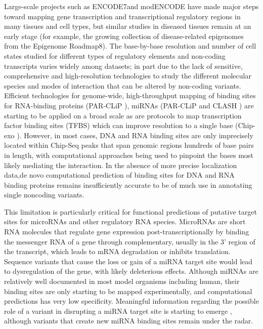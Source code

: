 Large-scale projects such as ENCODE7and modENCODE \cite{celniker2009unlocking} have made major steps toward mapping gene transcription and transcriptional regulatory regions in many tissues and cell types, but similar studies in diseased tissues remain at an early stage (for example, the growing collection of disease-related epigenomes from the Epigenome Roadmap8). The base-by-base resolution and number of cell states studied for different types of regulatory elements and non-coding transcripts varies widely among datasets; in part due to the lack of sensitive, comprehensive and high-resolution technologies to study the different molecular species and modes of interaction that can be altered by non-coding variants. Efficient technologies for genome-wide, high-throughput mapping of binding sites for RNA-binding proteins (PAR-CLiP \cite{ascano2012identification}), miRNAs (PAR-CLiP \cite{hafner2012genome} and CLASH \cite{helwak2013mapping}) are starting to be applied on a broad scale as are protocols to map transcription factor binding sites (TFBS) which can improve resolution to a single base (Chip-exo \cite{rhee2012chip}). However, in most cases, DNA and RNA binding sites are only imprecisely located within Chip-Seq peaks that span genomic regions hundreds of base pairs in length, with computational approaches being used to pinpoint the bases most likely mediating the interaction. In the absence of more precise localization data,de novo computational prediction of binding sites for DNA and RNA binding proteins remains insufficiently accurate to be of much use in annotating single noncoding variants.

This limitation is particularly critical for functional predictions of putative target sites for microRNAs and other regulatory RNA species. MicroRNAs are short RNA molecules that regulate gene expression post-transcriptionally by binding the messenger RNA of a gene through complementary, usually in the 3’ region of the transcript, which leads to mRNA degradation or inhibits translation. Sequence variants that cause the loss or gain of a miRNA target site would lead to dysregulation of the gene, with likely deleterious effects. Although miRNAs are relatively well documented in most model organisms including human, their binding sites are only starting to be mapped experimentally, and computational predictions has very low specificity. Meaningful information regarding the possible role of a variant in disrupting a miRNA target site is starting to emerge \cite{liu2012mirsnp}, although variants that create new miRNA binding sites remain under the radar.

